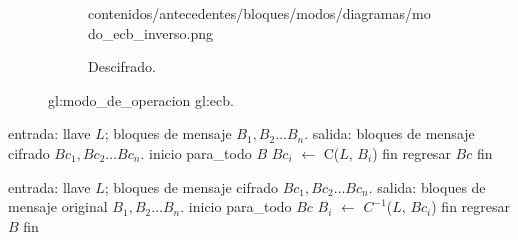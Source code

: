 \begin{figure}[H]
\begin{subfigure}{0.45\textwidth}
\begin{center}
        {contenidos/antecedentes/bloques/modos/diagramas/modo_ecb_inverso.png}
      \caption{Descifrado.}
    \end{center}
  \end{subfigure}
  \caption{\Gls{gl:modo_de_operacion} \acrshort{gl:ecb}.}
  \label{figura:ecb}
\end{figure}

\begin{pseudocodigo}[%
    caption={\Gls{gl:modo_de_operacion} \acrshort{gl:ecb}, cifrado.}%
  ]
  entrada: llave $ L $; bloques de mensaje $ B_1, B_2 \dots B_n $.
  salida:  bloques de mensaje cifrado $ Bc_1, Bc_2 \dots Bc_n $.
  inicio
    para_todo $B$
      $Bc_i$ $\gets$ C($L$, $B_i$)
    fin
    regresar $Bc$
  fin
\end{pseudocodigo}

\begin{pseudocodigo}[%
    caption={\Gls{gl:modo_de_operacion} \acrshort{gl:ecb}, descifrado.}%
  ]
  entrada: llave $ L $; bloques de mensaje cifrado $ Bc_1, Bc_2 \dots Bc_n $.
  salida:  bloques de mensaje original $ B_1, B_2 \dots B_n $.
  inicio
    para_todo $Bc$
      $B_i$ $\gets$ $C^{-1}$($L$, $Bc_i$)
    fin
    regresar $B$
  fin
\end{pseudocodigo}

